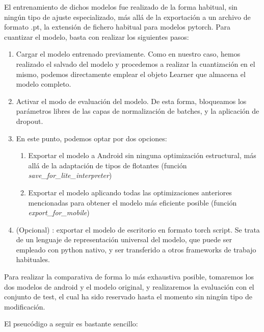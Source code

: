 El entrenamiento de dichos modelos fue realizado de la forma habitual, sin ningún tipo de ajuste especializado, más allá de la exportación a un archivo de formato .pt, la extensión de fichero habitual para modelos pytorch. Para cuantizar el modelo, basta con realizar los siguientes pasos:
\begin{enumerate}
	\item Cargar el modelo entrenado previamente. Como en nuestro caso, hemos realizado el salvado del modelo y procedemos a realizar la cuantización en el mismo, podemos directamente emplear el objeto Learner que almacena el modelo completo.
	\item Activar el modo de evaluación del modelo. De esta forma, bloqueamos los parámetros libres de las capas de normalización de batches, y la aplicación de dropout.
	\item En este punto, podemos optar por dos opciones:
	\begin{enumerate}
		\item Exportar el modelo a Android sin ninguna optimización estructural, más allá de la adaptación de tipos de flotantes (función \textit{save\_for\_lite\_interpreter})
		\item Exportar el modelo aplicando todas las optimizaciones anteriores mencionadas para obtener el modelo más eficiente posible (función \textit{export\_for\_mobile})
	\end{enumerate}
	\item (Opcional) : exportar el modelo de escritorio en formato torch script. Se trata de un lenguaje de representación universal del modelo, que puede ser empleado con python nativo, y ser transferido a otros frameworks de trabajo habituales.
		
\end{enumerate}

Para realizar la comparativa de forma lo más exhaustiva posible, tomaremos los dos modelos de android y el modelo original,  y realizaremos la evaluación con el conjunto de test, el cual ha sido reservado hasta el momento sin ningún tipo de modificación.

El pseucódigo a seguir es bastante sencillo:

